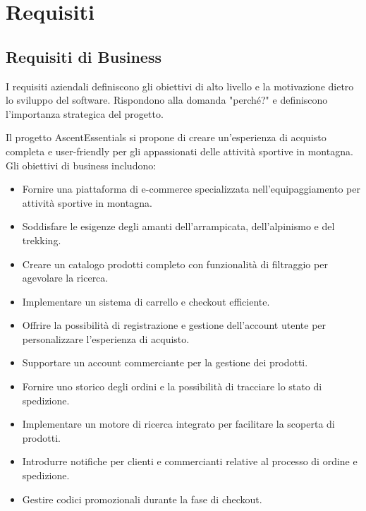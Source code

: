
\chapter{Requisiti}

\section{Requisiti di Business}
I requisiti aziendali definiscono gli obiettivi di alto livello e la motivazione dietro lo sviluppo del software. Rispondono alla domanda "perché?" e definiscono l'importanza strategica del progetto.

Il progetto AscentEssentials si propone di creare un'esperienza di acquisto completa e user-friendly per gli appassionati delle attività sportive in montagna. Gli obiettivi di business includono:
\begin{itemize}
    \item Fornire una piattaforma di e-commerce specializzata nell'equipaggiamento per attività sportive in montagna.
    \item Soddisfare le esigenze degli amanti dell'arrampicata, dell'alpinismo e del trekking.
    \item Creare un catalogo prodotti completo con funzionalità di filtraggio per agevolare la ricerca.
    \item Implementare un sistema di carrello e checkout efficiente.
    \item Offrire la possibilità di registrazione e gestione dell'account utente per personalizzare l'esperienza di acquisto.
    \item Supportare un account commerciante per la gestione dei prodotti.
    \item Fornire uno storico degli ordini e la possibilità di tracciare lo stato di spedizione.
    \item Implementare un motore di ricerca integrato per facilitare la scoperta di prodotti.
    \item Introdurre notifiche per clienti e commercianti relative al processo di ordine e spedizione.
    \item Gestire codici promozionali durante la fase di checkout.
\end{itemize}

